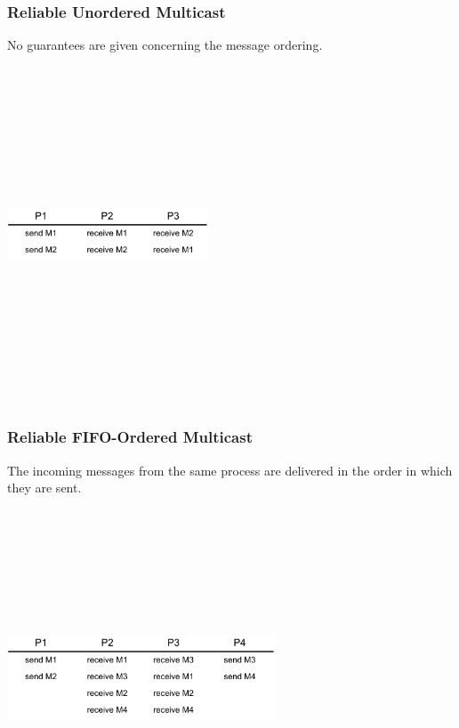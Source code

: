 \documentclass{article}
\begin{document}
\subsubsection{Reliable Unordered Multicast}
No guarantees are given concerning the message ordering.
\begin{center}
	\includegraphics[width=6cm, height=10cm, keepaspectratio]{assets/unordered.pdf}
\end{center}

\subsubsection{Reliable FIFO-Ordered Multicast}
The incoming messages from the same process are delivered in the order in which they are sent.
\begin{center}
	\includegraphics[width=8cm, height=10cm, keepaspectratio]{assets/fifo.pdf}
\end{center}
\end{document}
